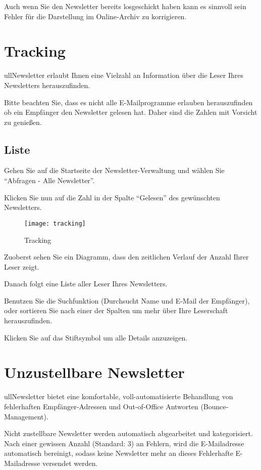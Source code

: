 \documentclass[article, a4paper, oneside, 11pt]{memoir}
\begin{document}
Auch wenn Sie den Newsletter bereits losgeschickt haben kann es sinnvoll sein Fehler für die Darstellung im Online-Archiv zu korrigieren.



\chapter{Tracking}
\label{sec:tracking}

ullNewsletter erlaubt Ihnen eine Vielzahl an Information über die Leser Ihres Newsletters herauszufinden.

Bitte beachten Sie, dass es nicht alle E-Mailprogramme erlauben herauszufinden ob ein Empfänger den Newsletter gelesen hat. Daher sind die Zahlen mit Vorsicht zu genießen.

\section{Liste}

Gehen Sie auf die Startseite der Newsletter-Verwaltung und wählen Sie "`Abfragen - Alle Newsletter"'. 

Klicken Sie nun auf die Zahl in der Spalte "`Gelesen"' des gewünschten Newsletters.


\begin{figure}[htp]
\centering
\texttt{[image: tracking]}
\caption{Tracking}
\label{fig:tracking}
\end{figure}

Zuoberst sehen Sie ein Diagramm, dass den zeitlichen Verlauf der Anzahl Ihrer Leser zeigt.

Danach folgt eine Liste aller Leser Ihres Newsletters. 

Benutzen Sie die Suchfunktion (Durchsucht Name und E-Mail der Empfänger), oder sortieren Sie nach einer der Spalten um mehr über Ihre Leserschaft herauszufinden.

Klicken Sie auf das Stiftsymbol um alle Details anzuzeigen.



\chapter{Unzustellbare Newsletter}
\label{sec:undeliverable}

ullNewsletter bietet eine komfortable, voll-automatisierte Behandlung von fehlerhaften Empfänger-Adressen und Out-of-Office Antworten (Bounce-Management).

Nicht zustellbare Newsletter werden automatisch abgearbeitet und kategorisiert.
Nach einer gewissen Anzahl (Standard: 3) an Fehlern, wird die E-Mailadresse automatisch bereinigt, sodass keine Newsletter mehr an dieses Fehlerhafte E-Mailadresse versendet werden.
\end{document}
